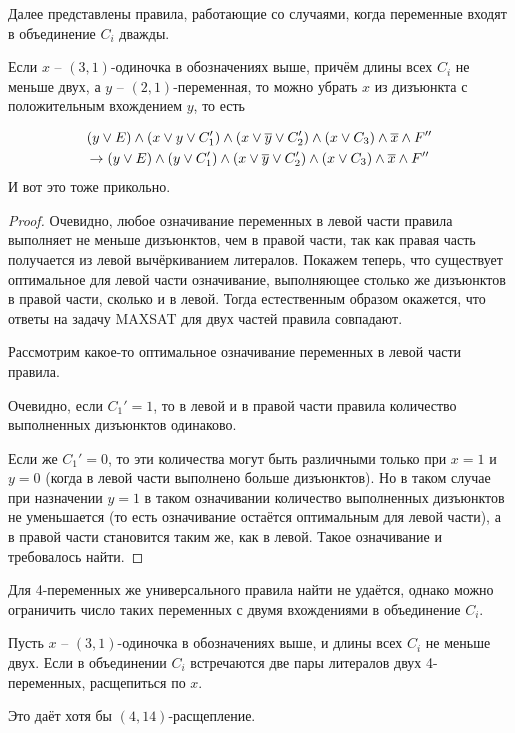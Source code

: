 Далее представлены правила, работающие со случаями, когда переменные входят в объединение $C_i$ дважды.

\begin{rrule}
 Если $x$ -- $(3,1)$-одиночка в обозначениях выше, причём длины всех $C_i$ не меньше двух, а $y$ -- $(2,1)$-переменная, то можно убрать $x$ из дизъюнкта с положительным вхождением $y$, то есть

 \begin{gather*}
  (y \vee E) \wedge (x \vee y \vee C_1') \wedge (x \vee \overline{y} \vee C_2') \wedge (x \vee C_3) \wedge \overline{x} \wedge F''\\
  \rightarrow
  (y \vee E) \wedge (y \vee C_1') \wedge (x \vee \overline{y} \vee C_2') \wedge (x \vee C_3) \wedge \overline{x} \wedge F''
 \end{gather*}
 {\color{white} И вот это тоже прикольно.}
 \label{rrule:n4:31:3v-2}
\end{rrule}

\begin{proof}
 Очевидно, любое означивание переменных в левой части правила выполняет не меньше дизъюнктов, чем в правой части, так как правая часть получается из левой вычёркиванием литералов.
 Покажем теперь, что существует оптимальное для левой части означивание, выполняющее столько же дизъюнктов в правой части, сколько и в левой. Тогда естественным образом окажется, что ответы на задачу MAXSAT для двух частей правила совпадают.

 Рассмотрим какое-то оптимальное означивание переменных в левой части правила.

 Очевидно, если $C_1' = 1$, то в левой и в правой части правила количество выполненных дизъюнктов одинаково.

 Если же $C_1' = 0$, то эти количества могут быть различными только при $x = 1$ и $y = 0$ (когда в левой части выполнено больше дизъюнктов). Но в таком случае при назначении $y = 1$ в таком означивании количество выполненных дизъюнктов не уменьшается (то есть означивание остаётся оптимальным для левой части), а в правой части становится таким же, как в левой.
 Такое означивание и требовалось найти.
\end{proof}

Для 4-переменных же универсального правила найти не удаётся, однако можно ограничить число таких переменных с двумя вхождениями в объединение $C_i$.

\begin{brule}
 Пусть $x$ -- $(3,1)$-одиночка в обозначениях выше, и длины всех $C_i$ не меньше двух. Если в объединении $C_i$ встречаются две пары литералов двух 4-переменных, расщепиться по $x$.

 Это даёт хотя бы $(4,14)$-расщепление.
 \label{brule:n4:31:4v-2}
\end{brule}

